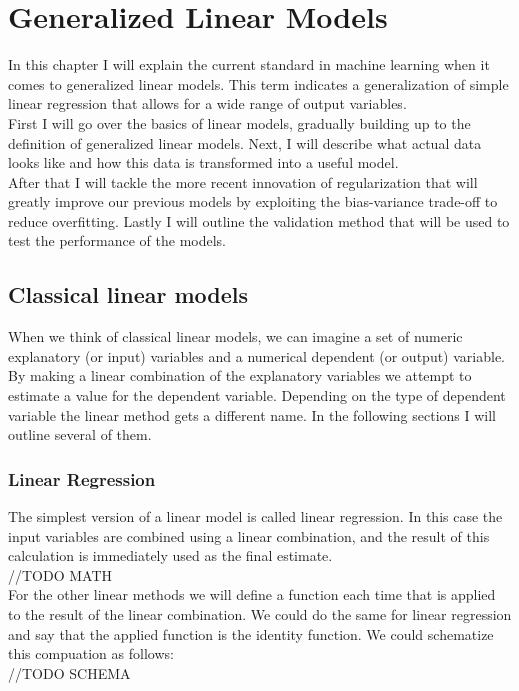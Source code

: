 \chapter{Generalized Linear Models}
\label{cha:1}
In this chapter I will explain the current standard in machine learning when it comes to generalized linear models. This term indicates a generalization of simple linear regression that allows for a wide range of output variables. \\
First I will go over the basics of linear models, gradually building up to the definition of generalized linear models. Next, I will describe what actual data looks like and how this data is transformed into a useful model.\\ After that I will tackle the more recent innovation of regularization that will greatly improve our previous models by exploiting the bias-variance trade-off to reduce overfitting. Lastly I will outline the validation method that will be used to test the performance of the models.

\section{Classical linear models}
When we think of classical linear models, we can imagine a set of numeric explanatory (or input) variables and a numerical dependent (or output) variable. By making a linear combination of the explanatory variables we attempt to estimate a value for the dependent variable. Depending on the type of dependent variable the linear method gets a different name. In the following sections I will outline several of them.

\subsection{Linear Regression}
The simplest version of a linear model is called linear regression. In this case the input variables are combined using a linear combination, and the result of this calculation is immediately used as the final estimate. \\
//TODO MATH \\
For the other linear methods we will define a function each time that is applied to the result of the linear combination. We could do the same for linear regression and say that the applied function is the identity function. We could schematize this compuation as follows: \\
//TODO SCHEMA \\
